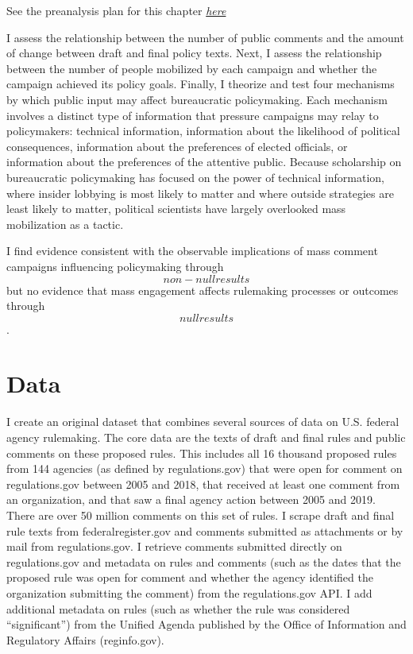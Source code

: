 \documentclass[
]{book}
\begin{document}
See the preanalysis plan for this chapter \href{https://github.com/judgelord/dissertation/blob/master/04-influence/preanalysis.pdf}{\emph{here}}

I assess the relationship between the number of
public comments and the amount of change between draft and final policy
texts. Next, I assess the relationship between the number of people
mobilized by each campaign and whether the campaign achieved its policy
goals. Finally, I theorize and test four mechanisms by which public
input may affect bureaucratic policymaking. Each mechanism involves a
distinct type of information that pressure campaigns may relay to
policymakers: technical information, information about the likelihood of
political consequences, information about the preferences of elected
officials, or information about the preferences of the attentive public.
Because scholarship on bureaucratic policymaking has focused on the
power of technical information, where insider lobbying is most likely to
matter and where outside strategies are least likely to matter,
political scientists have largely overlooked mass mobilization as a
tactic.

I find evidence consistent with the observable implications of mass
comment campaigns influencing policymaking through \[non-null results\]
but no evidence that mass engagement affects rulemaking processes or
outcomes through \[null results\].

\hypertarget{data}{%
\section{Data}\label{data}}

I create an original dataset that combines several sources of data on U.S. federal agency rulemaking.
The core data are the texts of draft and final rules and public comments on these proposed rules.
This includes all 16 thousand proposed rules from 144 agencies (as defined by regulations.gov) that were open for comment on regulations.gov between 2005 and 2018, that received at least one comment from an organization, and that saw a final agency action between 2005 and 2019.
There are over 50 million comments on this set of rules.
I scrape draft and final rule texts from federalregister.gov and comments submitted as attachments or by mail from regulations.gov.
I retrieve comments submitted directly on regulations.gov and metadata on rules and comments (such as the dates that the proposed rule was open for comment and whether the agency identified the organization submitting the comment) from the regulations.gov API.
I add additional metadata on rules (such as whether the rule was considered ``significant'') from the Unified Agenda published by the Office of Information and Regulatory Affairs (reginfo.gov).
\end{document}
